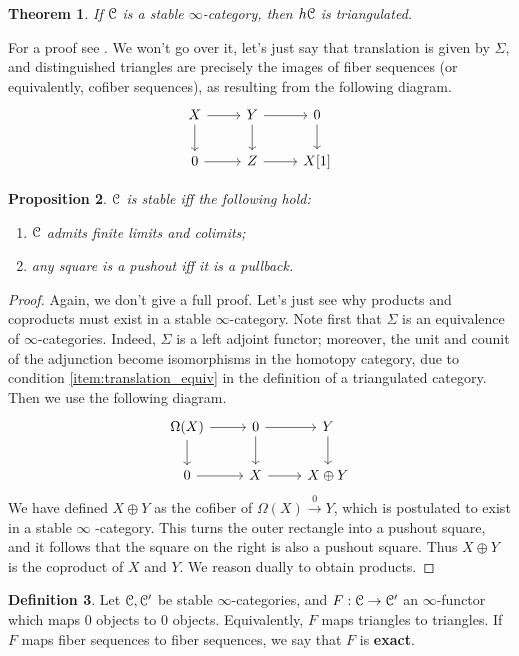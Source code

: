 \documentclass[10pt,a4paper,reqno,oneside]{book} %
\theoremstyle{plain}
\newtheorem{thm}{Theorem}[section]
\newtheorem{prop}[thm]{Proposition}
\theoremstyle{definition}
\newtheorem{defin}[thm]{Definition}
\theoremstyle{remark}
\numberwithin{equation}{section}
\begin{document}
\begin{thm}
\label{thm:stable_triang}
If $\mathcal C$ is a stable $\infty$-category, then $h\mathcal C$ is triangulated.
\end{thm}

For a proof see \cite{Lurie_Higher_algebra}. We won't go over it, let's just say that translation is given by $\Sigma$,
and distinguished triangles are precisely the images of fiber sequences (or equivalently, cofiber sequences), as resulting
from the following diagram.
\[
\begin{tikzcd}
X\arrow{r}\arrow{d} & Y \arrow{r}\arrow{d} & 0\arrow{d} \\
0\arrow{r} & Z \arrow{r} & X[1]
\end{tikzcd}
\]

\begin{prop}
$\mathcal C$ is stable iff the following hold:
\begin{enumerate}
\item $\mathcal C$ admits finite limits and colimits;
\item any square is a pushout iff it is a pullback.
\end{enumerate}
\end{prop}
\begin{proof}
Again, we don't give a full proof. Let's just see why products and coproducts must exist in a stable $\infty$-category. 
Note first that $\Sigma$ is an equivalence of
$\infty$-categories. Indeed, $\Sigma$ is a left adjoint functor; moreover, the unit and counit of the adjunction become 
isomorphisms in the homotopy category, due to condition \ref{item:translation_equiv} in the definition of a triangulated
category. Then we use the following diagram.
\[
\begin{tikzcd}
\Omega(X)\arrow{d}\arrow{r} & 0\arrow{d}\arrow{r} & Y\arrow{d} \\
0\arrow{r} & X\arrow{r} & X \oplus Y
\end{tikzcd}
\]
We have defined $X \oplus Y$ as the cofiber of $\Omega(X) \overset{0}{\to} Y$, which is postulated to exist in a stable $\infty$
-category. This turns the outer rectangle into a pushout square, and it follows that the square on the right is also a pushout
square. Thus $X\oplus Y$ is the coproduct of $X$ and $Y$. We reason dually to obtain products.
\end{proof}

\begin{defin}
Let $\mathcal C, \mathcal C'$ be stable $\infty$-categories, and $F: \mathcal C \to \mathcal C'$ an $\infty$-functor which maps 0 objects to 0 objects. 
Equivalently, $F$ maps triangles to triangles.
If $F$ maps fiber sequences to fiber sequences, we say that $F$ is \textbf{exact}.
\end{defin}
\end{document}
